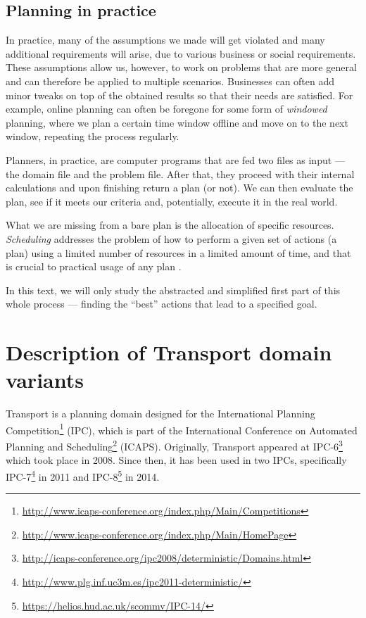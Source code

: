 \subsection{Planning in practice}

In practice, many of the assumptions we made will get violated and many additional requirements will arise,
due to various business or social requirements.
These assumptions allow us, however, to work
on problems that are more general and can therefore be applied to multiple scenarios.
Businesses can often add minor tweaks on top of the obtained results so that
their needs are satisfied. 
For example, online planning can often be foregone for some form of \textit{windowed} planning,
where we plan a certain time window offline and move on to the next window,
repeating the process regularly.

Planners, in practice, are computer programs that are fed two files as input
--- the domain file and the problem file. After that, they proceed with their internal calculations
and upon finishing return a plan (or not). 
We can then evaluate the plan, see if it meets our criteria and, potentially,
execute it in the real world.

What we are missing from a bare plan is the allocation of specific resources.
\textit{Scheduling} addresses the problem of how to perform a given set of actions (a plan)
using a limited number of resources in a limited amount of time, and
that is crucial to practical usage of any plan \citep[Chapter~15]{Ghallab2004}.

In this text, we will only study the abstracted and simplified first part of this whole process
--- finding the ``best'' actions that lead to a specified goal.
















\section{Description of Transport domain variants}

Transport is a planning domain designed for
the International Planning
Competition\footnote{\url{http://www.icaps-conference.org/index.php/Main/Competitions}}
(IPC), which is part of the International Conference on Automated Planning and
Scheduling\footnote{\url{http://www.icaps-conference.org/index.php/Main/HomePage}} (ICAPS).
Originally, Transport appeared at 
IPC-6\footnote{\url{http://icaps-conference.org/ipc2008/deterministic/Domains.html}} which took place in 2008.
Since then, it has been used in two IPCs,
specifically IPC-7\footnote{\url{http://www.plg.inf.uc3m.es/ipc2011-deterministic/}} in 2011
and IPC-8\footnote{\url{https://helios.hud.ac.uk/scommv/IPC-14/}} in 2014.

